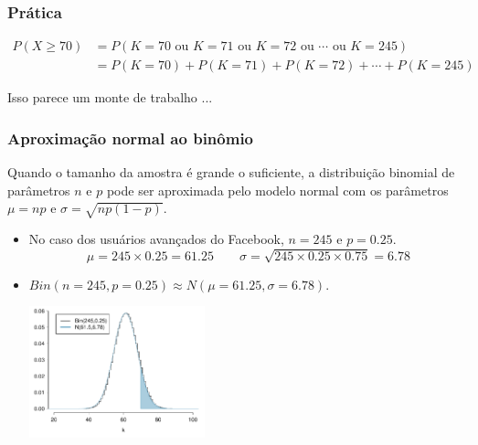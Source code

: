 \begin{frame}
\frametitle{Prática}
\begin{align*}
P(X \ge 70) &= P(K = 70\text{ ou }K = 71\text{ ou }K = 72\text{ ou }\cdots\text{ ou } K = 245) \\
&= P(K = 70) + P(K = 71) + P(K = 72) + \cdots + P(K = 245)
\end{align*}

\pause
\justifying
Isso parece um monte de trabalho ...

\end{frame}


\begin{frame}
\frametitle{Aproximação normal ao binômio}
\justifying
Quando o tamanho da amostra é grande o suficiente, a distribuição binomial de parâmetros $ n $ e $ p $ pode ser aproximada pelo modelo normal com os parâmetros $ \mu = np $ e $ \sigma = \sqrt {np (1-p)} $.

\begin{itemize}
\justifying
\item No caso dos usuários avançados do Facebook, $n = 245$ e $p = 0.25$.
\[ \mu = 245 \times 0.25 = 61.25 \qquad \sigma = \sqrt{245 \times 0.25 \times 0.75} = 6.78 \]
\justifying
\item $Bin(n = 245, p = 0.25) \approx N(\mu = 61.25, \sigma = 6.78)$.

\begin{center}
\includegraphics[width=0.4\textwidth]{3-4_binomial_distribution/fb_power_user.pdf}
\end{center}

\end{itemize}

\end{frame}


